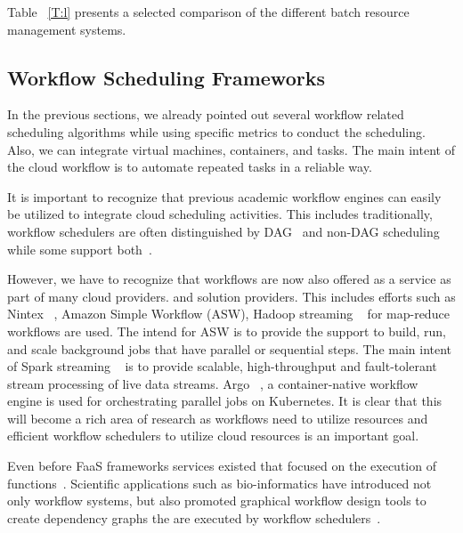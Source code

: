 \documentclass[final,5p,times,twocolumn]{elsarticle}
\begin{document}
Table ~\ref{T:l} presents a selected comparison of the different batch resource management systems.
 

%




\subsection{Workflow Scheduling Frameworks} 
\label{sec:workflow}

In the previous sections, we already pointed out several workflow related scheduling algorithms while using specific metrics to conduct the scheduling. Also, we can integrate virtual machines, containers, and tasks. The main intent of the cloud workflow is to automate repeated tasks in a reliable way.

It is important to recognize that previous academic workflow engines can easily be utilized to integrate cloud scheduling activities. This includes traditionally, workflow schedulers are often distinguished by DAG~\cite{deelman2005pegasus,deelman2004pegasus,thain2005distributed} and non-DAG scheduling while some support both~\cite{las-karajan,las-cogkit-1,las06-workflow-book}.

However, we have to recognize that workflows are now also offered as a service as part of many cloud providers. and solution providers. This includes efforts such as Nintex ~\cite{www-nintex-wf}, Amazon Simple Workflow (ASW), Hadoop streaming ~\cite{www-hadoop-streaming} for map-reduce workflows are used. The intend for ASW is to provide the support to build, run, and scale background jobs that have parallel or sequential steps. The main intent of Spark streaming ~\cite{www-spark-streaming} is to provide scalable, high-throughput and fault-tolerant stream processing of live data streams. Argo ~\cite{www-argo-wf}, a container-native workflow engine is used for orchestrating parallel jobs on Kubernetes. It is clear that this will become a rich area of research as workflows need to utilize resources and efficient workflow schedulers to utilize cloud resources is an important goal.

Even before FaaS frameworks services existed that focused on the execution of functions~\cite{las-infogram}. Scientific applications such as bio-informatics have introduced not only workflow systems, but also promoted graphical workflow design tools to create dependency graphs the are executed by workflow schedulers~\cite{oinn2004taverna,tan2010comparison,yu2005taxonomy}.
 
\end{document}
